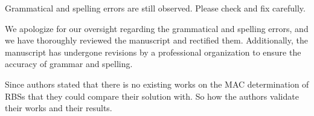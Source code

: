 \reviewer
\begin{revcomment}
  Grammatical and spelling errors are still observed. Please check and fix carefully.
\end{revcomment}
\begin{revresponse}

We apologize for our oversight regarding the grammatical and spelling errors, and we have thoroughly reviewed the manuscript and rectified them. Additionally, the manuscript has undergone revisions by a professional organization to ensure the accuracy of grammar and spelling.

\end{revresponse}

\begin{revcomment}
  Since authors stated that there is no existing works on the MAC determination of RBSs that they could compare their solution with. So how the authors validate their works and their results.
\end{revcomment}
